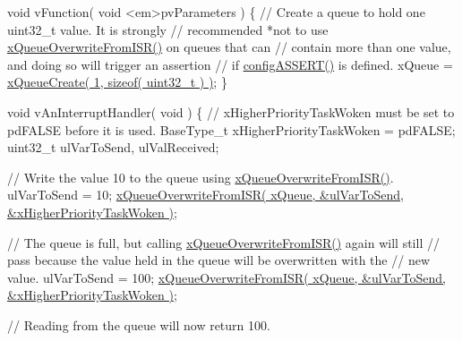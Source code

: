 \begin{DoxyPre}void vFunction( void <em>pvParameters )
\{
 // Create a queue to hold one uint32\_t value.  It is strongly
 // recommended *not to use \hyperlink{vendor_2ceedling_2plugins_2freertos_2src_2freertos_2include_2queue_8h_abdcd6a86ef82034d002193e79cfd3ce8}{xQueueOverwriteFromISR()} on queues that can
 // contain more than one value, and doing so will trigger an assertion
 // if \hyperlink{externals_2freertos_2include_2_free_r_t_o_s_8h_a228c70cd48927d6ab730ed1a6dfbe35f}{configASSERT()} is defined.
 xQueue = \hyperlink{vendor_2ceedling_2plugins_2freertos_2src_2freertos_2include_2queue_8h_aeb858b824bd74a934ea7ebb81af2a6bb}{xQueueCreate( 1, sizeof( uint32\_t ) )};
\}\end{DoxyPre}



\begin{DoxyPre}void vAnInterruptHandler( void )
\{
// xHigherPriorityTaskWoken must be set to pdFALSE before it is used.
BaseType\_t xHigherPriorityTaskWoken = pdFALSE;
uint32\_t ulVarToSend, ulValReceived;\end{DoxyPre}



\begin{DoxyPre} // Write the value 10 to the queue using \hyperlink{vendor_2ceedling_2plugins_2freertos_2src_2freertos_2include_2queue_8h_abdcd6a86ef82034d002193e79cfd3ce8}{xQueueOverwriteFromISR()}.
 ulVarToSend = 10;
 \hyperlink{vendor_2ceedling_2plugins_2freertos_2src_2freertos_2include_2queue_8h_abdcd6a86ef82034d002193e79cfd3ce8}{xQueueOverwriteFromISR( xQueue, &ulVarToSend, &xHigherPriorityTaskWoken )};\end{DoxyPre}



\begin{DoxyPre} // The queue is full, but calling \hyperlink{vendor_2ceedling_2plugins_2freertos_2src_2freertos_2include_2queue_8h_abdcd6a86ef82034d002193e79cfd3ce8}{xQueueOverwriteFromISR()} again will still
 // pass because the value held in the queue will be overwritten with the
 // new value.
 ulVarToSend = 100;
 \hyperlink{vendor_2ceedling_2plugins_2freertos_2src_2freertos_2include_2queue_8h_abdcd6a86ef82034d002193e79cfd3ce8}{xQueueOverwriteFromISR( xQueue, &ulVarToSend, &xHigherPriorityTaskWoken )};\end{DoxyPre}



\begin{DoxyPre} // Reading from the queue will now return 100.\end{DoxyPre}



